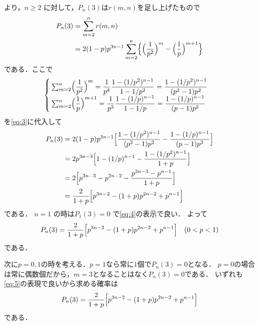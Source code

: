 \documentclass[../../main.tex]{subfiles}
\begin{document}
より，$n \ge 2$ に対して，$P_n(3)$は$r(m,n)$を足し上げたもので
\begin{align}
  P_n(3)
  &= \sum_{m=2}^{n} r(m,n) \\
  &= 2(1-p) p^{3n-1} \sum_{m=2}^n \Bigl\{ \Bigl(\dfrac{1}{p^2}\Bigr)^m - \Bigl(\dfrac{1}{p}\Bigr)^{m+1} \Bigr\} \label{eq:3}
\end{align}
である．ここで
\begin{align}
  \begin{cases}
    \sum_{m=2}^n \Bigl(\dfrac{1}{p^2}\Bigr)^m = \dfrac{1}{p^4} \dfrac{1-(1/p^2)^{n-1}}{1-1/p^2} = \dfrac{1-(1/p^2)^{n-1}}{(p^2-1)p^2} \\
    \sum_{m=2}^n \Bigl(\dfrac{1}{p}\Bigr)^{m+1} = \dfrac{1}{p^3} \dfrac{1-(1/p)^{n-1}}{1-1/p} = \dfrac{1-(1/p)^{n-1}}{(p-1)p^2}
  \end{cases}
\end{align}
を\cref{eq:3}に代入して
\begin{align}
  P_n(3)
  &= 2(1-p) p^{3n-1} \Bigl[ \dfrac{1-(1/p^2)^{n-1}}{(p^2-1)p^2} - \dfrac{1-(1/p)^{n-1}}{(p-1)p^2} \Bigr] \\
  &= 2 p^{3n-3} \Bigl[ 1 - (1/p)^{n-1} - \dfrac{1-(1/p^2)^{n-1}}{1+p} \Bigr] \\
  &= 2 \Bigl[ p^{3n-3} - p^{2n-2} - \dfrac{p^{3n-3}-p^{n-1}}{1+p} \Bigr] \\
  &= \dfrac{2}{1+p} \Bigl[ p^{3n-2} - (1+p) p^{2n-2} + p^{n-1} \Bigr] \label{eq:4}
\end{align}
である．
$n=1$ の時は$P_1(3)=0$ で\cref{eq:4}の表示で良い．
よって
\begin{align}
  P_n(3) = \dfrac{2}{1+p} \Bigl[ p^{3n-2} - (1+p) p^{2n-2} + p^{n-1} \Bigr]
  \quad (0<p<1) \label{eq:5}
\end{align}
である．

次に$p=0,1$の時を考える．$p=1$なら常に$1$個で$P_n(3)=0$となる．
$p=0$の場合は常に偶数個だから，$m=3$となることはなく$P_n(3)=0$である．
いずれも\cref{eq:5}の表現で良いから求める確率は
\begin{align}
  P_n(3) = \dfrac{2}{1+p} \Bigl[ p^{3n-2} - (1+p) p^{2n-2} + p^{n-1} \Bigr]
\end{align}
である．
\end{document}

